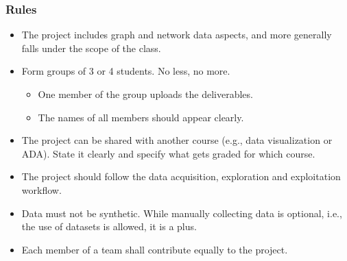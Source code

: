 \documentclass{beamer}
\begin{document}
\begin{frame}
	\frametitle{Rules}
	\begin{itemize}
		\item The project includes graph and network data aspects, and more
			generally falls under the scope of the class.
		\vfill
		\item Form groups of 3 or 4 students. No less, no more.
			\begin{itemize}
				\item One member of the group uploads the deliverables.
				\item The names of all members should appear clearly.
			\end{itemize}
		\vfill
		\item The project can be shared with another course (e.g., data
			visualization or ADA). State it clearly and specify what gets
			graded for which course.
		\item The project should follow the data acquisition, exploration and
			exploitation workflow.
		\vfill
		\item Data must not be synthetic. While manually collecting data is
			optional, i.e., the use of datasets is allowed, it is a plus.
		\vfill
		\item Each member of a team shall contribute equally to the project.
	\end{itemize}
\end{frame}

\end{document}
